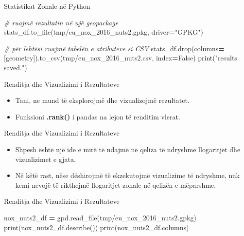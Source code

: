 \documentclass[
  ignorenonframetext,
]{beamer}
\newenvironment{Shaded}{\begin{snugshade}}{\end{snugshade}}
\newcommand{\BuiltInTok}[1]{#1}
\newcommand{\CommentTok}[1]{\textcolor[rgb]{0.56,0.35,0.01}{\textit{#1}}}
\newcommand{\NormalTok}[1]{#1}
\newcommand{\OperatorTok}[1]{\textcolor[rgb]{0.81,0.36,0.00}{\textbf{#1}}}
\newcommand{\StringTok}[1]{\textcolor[rgb]{0.31,0.60,0.02}{#1}}
\newcommand{\VariableTok}[1]{\textcolor[rgb]{0.00,0.00,0.00}{#1}}
\begin{document}
\begin{frame}[fragile]{Statistikat Zonale në Python}
\protect\hypertarget{statistikat-zonale-nuxeb-python-6}{}

\begin{Shaded}
\begin{Highlighting}[]
\CommentTok{\# ruajmë rezultatin në një geopackage}
\NormalTok{stats\_df.to\_file(}\StringTok{\textquotesingle{}tmp/eu\_nox\_2016\_nuts2.gpkg\textquotesingle{}}\NormalTok{, driver}\OperatorTok{=}\StringTok{"GPKG"}\NormalTok{)}

\CommentTok{\# për lehtësi ruajmë tabelën e atributeve si CSV}
\NormalTok{stats\_df.drop(columns}\OperatorTok{=}\NormalTok{[}\StringTok{\textquotesingle{}geometry\textquotesingle{}}\NormalTok{]).to\_csv(}\StringTok{\textquotesingle{}tmp/eu\_nox\_2016\_nuts2.csv\textquotesingle{}}\NormalTok{, index}\OperatorTok{=}\VariableTok{False}\NormalTok{)}
\BuiltInTok{print}\NormalTok{(}\StringTok{"results saved."}\NormalTok{)}
\end{Highlighting}
\end{Shaded}
\end{frame}

\begin{frame}{Renditja dhe Vizualizimi i Rezultateve}
\protect\hypertarget{renditja-dhe-vizualizimi-i-rezultateve}{}
\begin{itemize}
\item
  Tani, ne mund të eksplorojmë dhe vizualizojmë rezultatet.
\item
  Funksioni \textbf{.rank()} i pandas na lejon të renditim vlerat.
\end{itemize}
\end{frame}

\begin{frame}{Renditja dhe Vizualizimi i Rezultateve}
\protect\hypertarget{renditja-dhe-vizualizimi-i-rezultateve-1}{}
\begin{itemize}
\item
  Shpesh është një ide e mirë të ndajmë në qeliza të ndryshme
  llogaritjet dhe vizualizimet e gjata.
\item
  Në këtë rast, nëse dëshirojmë të ekzekutojmë vizualizime të ndryshme,
  nuk kemi nevojë të rikthejmë llogaritjet zonale në qelizën e
  mëparshme.
\end{itemize}
\end{frame}

\begin{frame}[fragile]{Renditja dhe Vizualizimi i Rezultateve}
\protect\hypertarget{renditja-dhe-vizualizimi-i-rezultateve-2}{}

\begin{Shaded}
\begin{Highlighting}[]
\NormalTok{nox\_nuts2\_df }\OperatorTok{=}\NormalTok{ gpd.read\_file(}\StringTok{\textquotesingle{}tmp/eu\_nox\_2016\_nuts2.gpkg\textquotesingle{}}\NormalTok{)}
\BuiltInTok{print}\NormalTok{(nox\_nuts2\_df.describe())}
\BuiltInTok{print}\NormalTok{(nox\_nuts2\_df.columns)}
\end{Highlighting}
\end{Shaded}
\end{frame}
\end{document}
